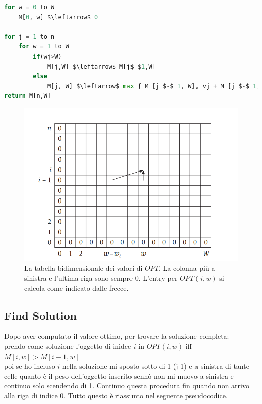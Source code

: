 \begin{lstlisting}[language=Python, mathescape=true]
for w = 0 to W 
	M[0, w] $\leftarrow$ 0
	
for j = 1 to n
	for w = 1 to W
		if(wj>W) 
			M[j,W] $\leftarrow$ M[j$-$1,W]
		else 
			M[j, W] $\leftarrow$ max { M [j $-$ 1, W], vj + M [j $-$ 1, W $-$ wj] }
return M[n,W]
\end{lstlisting}
\begin{figure}[H]
  \centering
  \includegraphics[width = 15cm, keepaspectratio]{capitoli/programmazione_dinamica/imgs/knapsack_opt.png}
  \caption{La tabella bidimensionale dei valori di $OPT$.
    La colonna più a sinistra e l'ultima riga sono sempre 0. L'entry
    per $OPT(i, w)$ si calcola come indicato dalle frecce.}
\end{figure}


\subsection{Find Solution}

Dopo aver computato il valore ottimo, per trovare la soluzione completa:\\

prendo come soluzione l'oggetto di inidce $i$ in $OPT(i, w)$ iff
$M[i, w] > M[i-1, w]$\\

poi se ho incluso $i$ nella soluzione mi sposto sotto di 1 (j-1) e a
sinistra di tante celle quanto è il peso dell'oggetto inserito sennò non
mi muovo a sinistra e continuo solo scendendo di 1. Continuo questa
procedura fin quando non arrivo alla riga di indice 0. Tutto questo è
riassunto nel seguente pseudocodice.

